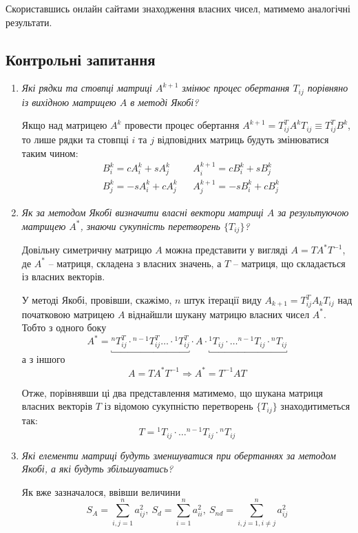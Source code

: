 \documentclass[a4paper,14pt]{extarticle} %
\begin{document}
Скориставшись онлайн сайтами знаходження власних чисел, матимемо аналогічні результати.

\subsection*{Контрольні запитання}

\begin{enumerate}
    \item \textit{Які рядки та стовпці матриці $A^{k+1}$ змінює процес обертання $T_{ij}$ порівняно із 
    вихідною матрицею $A$ в методі Якобі?}

    Якщо над матрицею $A^{k}$ провести процес обертання $A^{k+1}=T_{ij}^T A^k T_{ij}\equiv T_{ij}^T B^k$, то 
    лише рядки та стовпці $i$ та $j$ відповідних матриць будуть змінюватися таким чином:
    \begin{align*}
        & B^k_i=cA^k_i+sA^k_j && A^{k+1}_i=cB^k_i+sB^k_j \\
        & B^k_j=-sA^k_i+cA^k_j && A^{k+1}_j=-sB^k_i+cB^k_j   
    \end{align*}

    \item \textit{Як за методом Якобі визначити власні вектори матриці $A$ за результуючою матрицею $A^*$,
    знаючи сукупність перетворень $\{T_{ij}\}$?}

    Довільну симетричну матрицю $A$ можна представити у вигляді $A=TA^*T^{-1}$, де $A^*$ -- матриця, складена 
    з власних значень, а $T$ -- матриця, що складається із власних векторів. 
    
    У методі Якобі, провівши, скажімо, $n$ штук ітерації виду $A_{k+1}=T_{ij}^TA_{k}T_{ij}$ над 
    початковою матрицею $A$ віднайшли шукану матрицю власних чисел $A^*$. Тобто з одного боку
    \[ A^*= \underbracket{{^n}T_{ij}^T\cdot {^{n-1}}T_{ij}^T\ldots \cdot {^1}T_{ij}^T} \cdot A \cdot \underbracket{{^1}T_{ij}\cdot \ldots {^{n-1}}T_{ij}\cdot {^n}T_{ij}} \] 
    а з іншого
    \[ A=TA^*T^{-1} \Rightarrow A^*=T^{-1}AT \]

    Отже, порівнявши ці два представлення матимемо, що шукана матриця власних векторів $T$ із відомою 
    сукупністю перетворень $\{T_{ij}\}$ знаходитиметься так:
    \[ T={^1}T_{ij}\cdot \ldots {^{n-1}}T_{ij}\cdot {^n}T_{ij} \]

    \item \textit{Які елементи матриці будуть зменшуватися при обертаннях за методом Якобі, а які будуть
    збільшуватись?}

    Як вже зазначалося, ввівши величини
    \[ S_A=\sum\limits_{i,j=1}^n a_{ij}^2,\ S_d=\sum\limits_{i=1}^n a_{ii}^2,\ S_{nd}=\sum\limits_{i,j=1,i\neq j}^n a_{ij}^2 \]
    

\end{enumerate}
\end{document}
